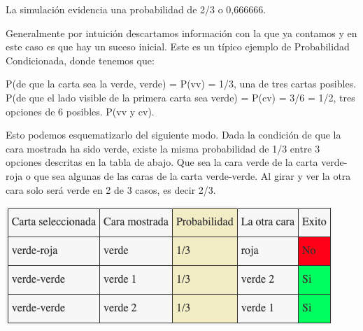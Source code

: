 \documentclass[../main.tex]{subfiles}
\begin{document}
\begin{enumerate}
    La simulación evidencia una probabilidad de 2/3 o 0,666666.

Generalmente por intuición descartamos información con la que ya contamos y en este caso es que hay un suceso inicial. Este es un típico ejemplo de Probabilidad Condicionada, donde tenemos que:

P(de que la carta sea la verde, verde) = P(vv) = 1/3, una de tres cartas posibles. P(de que el lado visible de la primera carta sea verde) = P(cv) = 3/6 = 1/2, tres opciones de 6 posibles. P(vv y cv).

Esto podemos esquematizarlo del siguiente modo. Dada la condición de que la cara mostrada ha sido verde, existe la misma probabilidad de 1/3 entre 3 opciones descritas en la tabla de abajo. Que sea la cara verde de la carta verde-roja o que sea algunas de las caras de la carta verde-verde. Al girar y ver la otra cara solo será verde en 2 de 3 casos, es decir 2/3.\\

\end{enumerate}

\centering
\includegraphics[scale=0.8]{images/table.png}

\bigskip
\end{document}
